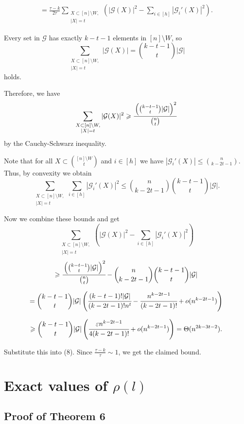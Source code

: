 \documentclass[12pt,a4paper]{article}
\newcommand{\cG}{\mathcal{G}}
\begin{document}
\begin{align}
=\frac{\tau - k}{2\tau} \sum_{\substack{X \subset [n] \setminus W,\\ |X|=t}}\left(|\cG(X)|^2 - \sum_{i \in [h]}|\mathcal{G}_i'(X)|^2\right).    
\end{align}

Every set in $\cG$ has exactly $k-t-1$ elements in $[n] \setminus W$, so
$$\sum_{\substack{X \subset [n] \setminus W,\\ |X|=t}} |\mathcal{G}(X)| = \binom{k-t-1}{t} |\cG|$$
holds.

Therefore, we have
$$\sum_{\substack{X \subset [n] \setminus W,\\ |X|=t}} |\mathcal{G}(X)|^2 \geqslant \cfrac{\left(\binom{k-t-1}{t} |\mathcal{G}|\right)^2}{\binom{n}{t}}$$
by the Cauchy-Schwarz inequality.

Note that for all $X \subset \binom{[n] \setminus W}{t}$ and $i \in [h]$ we have $|\mathcal{G}_i'(X)| \leqslant \binom{n}{k-2t-1}$. Thus, by convexity we obtain
$$\sum_{\substack{X \subset [n] \setminus W,\\ |X|=t}} \sum_{i \in [h]}|\mathcal{G}_i'(X)|^2 \leqslant \binom{n}{k-2t-1}  \binom{k-t-1}{t} |\mathcal{G}|.$$

Now we combine these bounds and get
$$\sum_{\substack{X \subset [n] \setminus W,\\ |X|=t}}\left(|\cG(X)|^2 - \sum_{i \in [h]}|\mathcal{G}_i'(X)|^2\right)$$
$$\geqslant \cfrac{\left(\binom{k-t-1}{t} |\mathcal{G}|\right)^2}{\binom{n}{t}} - \binom{n}{k-2t-1}  \binom{k-t-1}{t} |\mathcal{G}|$$

$$=  \binom{k-t-1}{t} |\mathcal{G}|\left(\cfrac{(k-t-1)!|\mathcal{G}|}{(k-2t-1)!n^t} - \cfrac{n^{k-2t-1}}{(k-2t-1)!} + o(n^{k-2t-1})\right)$$



$$\geqslant \binom{k-t-1}{t} |\mathcal{G}|\left(\cfrac{\varepsilon n^{k-2t-1}}{4(k-2t-1)!} + o(n^{k-2t-1})\right) = \Theta(n^{2k-3t-2}).$$

Substitute this into (8). Since $\frac{\tau - k}{\tau} \sim 1$, we get the claimed bound.




\section{Exact values of $\rho(l)$}\label{sec5}

\subsection{Proof of Theorem 6}\label{sec51}
\end{document}
